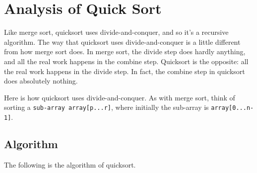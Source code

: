 \documentclass[a4paper,12pt]{article}
\theoremstyle{definition}
\begin{document}
    \section{Analysis of Quick Sort}

    Like merge sort, quicksort uses divide-and-conquer, and so it's a recursive algorithm.
    The way that quicksort uses divide-and-conquer is a little different from how merge sort does.
    In merge sort, the divide step does hardly anything, and all the real work happens in the combine step.
    Quicksort is the opposite: all the real work happens in the divide step. In fact, the combine step in
    quicksort does absolutely nothing.

    Here is how quicksort uses divide-and-conquer.
    As with merge sort, think of sorting a \texttt{sub-array array[p...r]}, where initially the
    sub-array is \texttt{array[0...n-1]}.

    \subsection{Algorithm}

    The following is the algorithm of quicksort.
\end{document}
